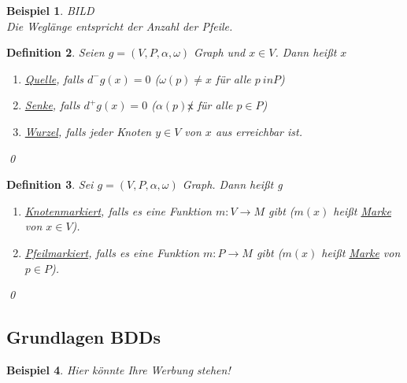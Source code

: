 \documentclass[ngerman]{scrartcl}
\theoremstyle{custom}
\newtheorem{mdef}{Definition} \numberwithin{mdef}{subsection}
\newtheorem{mex}[mdef]{Beispiel}
\newcommand{\0}{\mathbf{0}}
\newcommand{\1}{\mathbf{L}}
\begin{document}
\begin{mex}
BILD\\
Die Wegl\"ange entspricht der Anzahl der Pfeile.
\end{mex}

\begin{mdef}
Seien $g = (V,P,\alpha, \omega)$ Graph und $x \in V$. Dann hei\ss t
$x$
\begin{enumerate}
\item[(1)] \underline{Quelle}, falls $d^-g(x)=0$ ($\omega(p) \not = x$
  f\"ur alle $p \ in P$)
\item[(2)] \underline{Senke}, falls $d^+g(x)=0$ ($\alpha(p) \not x$
  f\"ur alle $p \in P$)
\item[(3)] \underline{Wurzel}, falls jeder Knoten $y \in V$ von $x$
  aus erreichbar ist.
\end{enumerate}
\qed
\end{mdef}

\begin{mdef}
Sei $g = (V,P, \alpha, \omega)$ Graph. Dann hei\ss t g
\begin{enumerate}
\item[(1)] \underline{Knotenmarkiert}, falls es eine Funktion $m: V
  \rightarrow M$ gibt ($m(x)$ hei\ss t \underline{Marke} von $x \in
  V$).
\item[(2)] \underline{Pfeilmarkiert}, falls es eine Funktion $m: P
  \rightarrow M$ gibt ($m(x)$ hei\ss t \underline{Marke} von $p \in P$).
\end{enumerate}
\qed
\end{mdef}

\subsection{Grundlagen BDDs}

\begin{mex} \label{mex221}
Hier k\"onnte Ihre Werbung stehen!
\end{mex}
\end{document}

